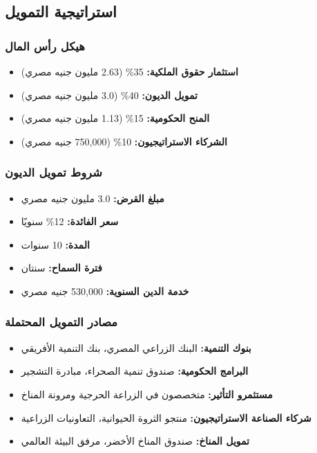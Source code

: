 \subsection{استراتيجية التمويل}

\subsubsection{هيكل رأس المال}
\begin{itemize}
    \item \textbf{استثمار حقوق الملكية:} 35\% (2.63 مليون جنيه مصري)
    \item \textbf{تمويل الديون:} 40\% (3.0 مليون جنيه مصري)
    \item \textbf{المنح الحكومية:} 15\% (1.13 مليون جنيه مصري)
    \item \textbf{الشركاء الاستراتيجيون:} 10\% (750,000 جنيه مصري)
\end{itemize}

\subsubsection{شروط تمويل الديون}
\begin{itemize}
    \item \textbf{مبلغ القرض:} 3.0 مليون جنيه مصري
    \item \textbf{سعر الفائدة:} 12\% سنويًا
    \item \textbf{المدة:} 10 سنوات
    \item \textbf{فترة السماح:} سنتان
    \item \textbf{خدمة الدين السنوية:} 530,000 جنيه مصري
\end{itemize}

\subsubsection{مصادر التمويل المحتملة}
\begin{itemize}
    \item \textbf{بنوك التنمية:} البنك الزراعي المصري، بنك التنمية الأفريقي
    \item \textbf{البرامج الحكومية:} صندوق تنمية الصحراء، مبادرة التشجير
    \item \textbf{مستثمرو التأثير:} متخصصون في الزراعة الحرجية ومرونة المناخ
    \item \textbf{شركاء الصناعة الاستراتيجيون:} منتجو الثروة الحيوانية، التعاونيات الزراعية
    \item \textbf{تمويل المناخ:} صندوق المناخ الأخضر، مرفق البيئة العالمي
\end{itemize}

